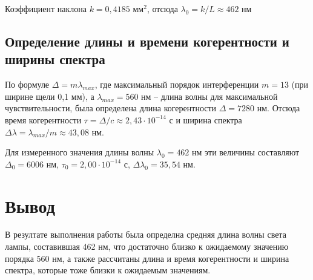\documentclass[a4paper,12pt]{extarticle}
\begin{document}
Коэффициент наклона $k = 0,4185$ мм$^2$, отсюда $\lambda_0 = k/L \approx 462$ нм


\subsection*{Определение длины и времени когерентности и ширины спектра}

По формуле $\Delta = m \lambda_{max}$, где максимальный порядок интерференции $m = 13$ (при ширине щели 0,1 мм),
а $\lambda_{max} = 560$ нм -- длина волны для максимальной чувствительности, была определена длина когерентности $\Delta = 7280$ нм.
Отсюда время когерентности $\tau = \Delta/c \approx 2,43 \cdot 10^{-14}$ с
и ширина спектра $\Delta \lambda = \lambda_{max}/m \approx 43,08$ нм.

Для измеренного значения длины волны $\lambda_0 = 462$ нм эти величины составляют $\Delta_0 = 6006$ нм, $\tau_0 = 2,00 \cdot 10^{-14}$ с, $\Delta \lambda_0 = 35,54$ нм.






\section*{Вывод}
\qquad В резултате выполнения работы была определна средняя длина волны света лампы, составившая 462 нм, что достаточно близко к ожидаемому значению порядка 560 нм, а также рассчитаны длина и время когерентности и ширина спектра, которые тоже близки к ожидаемым значениям.
\end{document}
